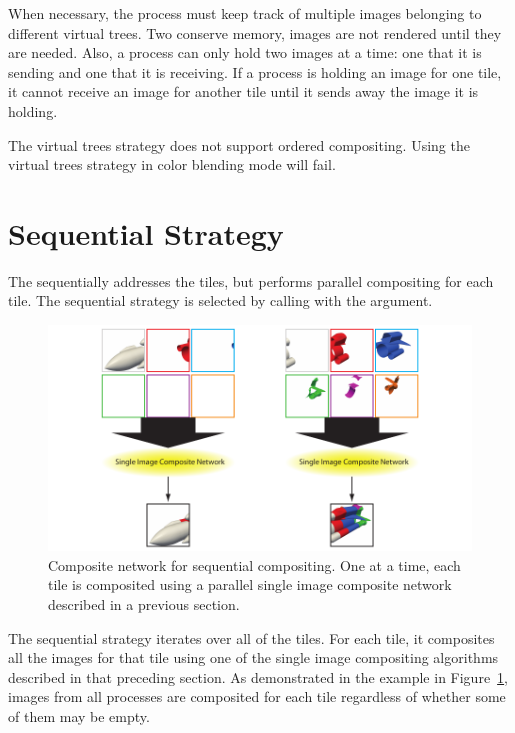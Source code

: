 When necessary, the process must keep track of multiple images belonging to
different virtual trees.  Two conserve memory, images are not rendered
until they are needed.  Also, a process can only hold two images at a time:
one that it is sending and one that it is receiving.  If a process is
holding an image for one tile, it cannot receive an image for another tile
until it sends away the image it is holding.

The virtual trees strategy does not support ordered compositing.  Using the
virtual trees strategy in color blending mode will fail.


\section{Sequential Strategy}
\label{sec:Strategies:Sequential}


The  sequentially addresses the tiles, but
performs parallel compositing for each tile.  The sequential strategy is
selected by calling  with the
 argument.

\begin{figure}
  \centering
  \includegraphics{images/SequentialComposite}
  \caption[Sequential compositing network.]{Composite network for
    sequential compositing.  One at a time, each tile is composited using a
    parallel single image composite network described in a previous
    section.}
  \label{fig:SequentialComposite}
\end{figure}

The sequential strategy iterates over all of the tiles.  For each tile, it
composites all the images for that tile using one of the single image
compositing algorithms described in that preceding section.  As
demonstrated in the example in Figure~\ref{fig:SequentialComposite}, images
from all processes are composited for each tile regardless of whether some
of them may be empty.

